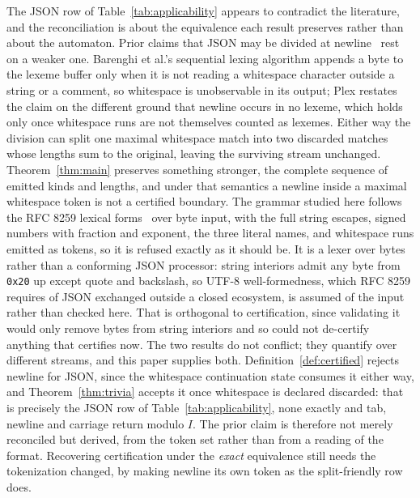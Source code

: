 \documentclass[11pt,a4paper]{article}
\theoremstyle{definition}
\theoremstyle{plain}
\newcommand{\code}[1]{\texttt{#1}}
\begin{document}
The JSON row of Table~\ref{tab:applicability} appears to contradict the literature, and the reconciliation is about
the equivalence each result preserves rather than about the automaton. Prior claims that JSON may be divided at
newline~\cite{barenghi2015parallel,li2021plex} rest on a weaker one. Barenghi et al.'s sequential lexing algorithm
appends a byte to the lexeme buffer only when it is not reading a whitespace character outside a string or a comment,
so whitespace is unobservable in its output; Plex restates the claim on the different ground that newline occurs in no
lexeme, which holds only once whitespace runs are not themselves counted as lexemes. Either way the division can split
one maximal whitespace match into two discarded matches whose lengths sum to the original, leaving the surviving
stream unchanged. Theorem~\ref{thm:main} preserves something stronger, the complete sequence of emitted kinds and
lengths, and under that semantics a newline inside a maximal whitespace token is not a certified boundary. The grammar
studied here follows the RFC 8259 lexical forms~\cite{bray2017json} over byte input, with the full string escapes,
signed numbers with fraction and exponent, the three literal names, and whitespace runs emitted as tokens, so it is
refused exactly as it should be. It is a lexer over bytes rather than a conforming JSON processor: string interiors
admit any byte from \code{0x20} up except quote and backslash, so UTF-8 well-formedness, which RFC 8259 requires of
JSON exchanged outside a closed ecosystem, is assumed of the input rather than checked here. That is orthogonal to
certification, since validating it would only remove bytes from string interiors and so could not de-certify anything
that certifies now. The two results do not conflict; they quantify over different streams, and this paper supplies
both. Definition~\ref{def:certified} rejects newline for JSON, since the whitespace continuation state consumes it
either way, and Theorem~\ref{thm:trivia} accepts it once whitespace is declared discarded: that is precisely the JSON
row of Table~\ref{tab:applicability}, none exactly and tab, newline and carriage return modulo $I$. The prior claim is
therefore not merely reconciled but derived, from the token set rather than from a reading of the format. Recovering
certification under the \emph{exact} equivalence still needs the tokenization changed, by making newline its own token
as the split-friendly row does.
\end{document}
